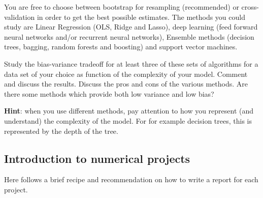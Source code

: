 \documentclass[%
oneside,                 %
final,                   %
10pt]{article}
\begin{document}
You
are free to choose between bootstrap for resampling (recommended) or
cross-validation in order to get the best possible estimates. The
methods you could study are Linear Regression (OLS, Ridge and Lasso),
deep learning (feed forward neural networks and/or recurrent neural
networks), Ensemble methods (decision trees, bagging, random forests
and boosting) and support vector machines.

Study the bias-variance tradeoff for at least three of these sets of
algorithms for a data set of your choice as function of the complexity
of your model.  Comment and discuss the results. Discuss the pros and
cons of the various methods. Are there some methods which provide both
low variance and low bias?

\textbf{Hint}: when you use different methods, pay attention to how you represent (and understand) the complexity of the model. For for example decision trees, this is represented by the depth of the tree. 

\subsection*{Introduction to numerical projects}

Here follows a brief recipe and recommendation on how to write a report for each
project.
\end{document}
